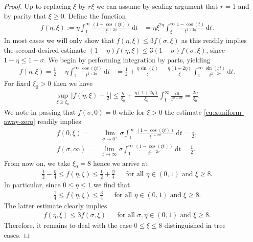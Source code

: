 \documentclass[12pt, reqno]{amsart}%
\theoremstyle{plain}  %
\theoremstyle{definition}  %
\theoremstyle{remark}
\numberwithin{equation}{section}
\renewcommand{\d}{\,\mathrm{d}}
\begin{document}
\begin{proof}
Up to replacing $\xi$ by $r\xi$ we can assume by scaling argument that $r=1$ and by parity that $\xi\geq 0$.
 Define the function
\begin{align*}
f(\eta,\xi):=\eta  \int_1^\infty \frac{(1-\cos (\xi t))}{t^{1+2\eta}}\d t&= \eta \xi^{2\eta}  \int_{\xi}^\infty \frac{1-\cos (t)}{t^{1+2\eta}}\d t.
\end{align*}
In most cases we  will only show that $f(\eta,\xi)\leq 3 f(\sigma,\xi)$ as this readily implies
the second desired estimate $ (1-\eta)f(\eta,\xi)\leq 3 (1-\sigma)f(\sigma,\xi)$, since $1-\eta\leq 1-\sigma$. We begin by performing integration by parts, yielding
\begin{align}\label{eq:xexpansion-away-zero}
f(\eta,\xi)= \frac{1}{2}- \eta  \int_1^\infty \frac{\cos (\xi t)}{t^{1+2\eta}}\d t
&=\frac{1}{2} + \frac{\eta\sin (\xi)}{\xi} -\frac{\eta(1+2\eta)}{\xi}   \int_1^\infty \frac{\sin (\xi t)}{t^{2+2\eta}}\d t.
\end{align}
For fixed $\xi_0>0$  then we have
\begin{align}\label{eq:xuniform-away-zero}
\sup_{\xi\geq \xi_0}\Big| f(\eta,\xi)-\frac12\Big| \leq \frac{\eta}{\xi_0}+ \frac{\eta (1+2\eta)}{\xi_0}\int_1^\infty\frac{\d t}{t^{2+2\eta}}=
\frac{2\eta}{\xi_0}.
\end{align}
We note in passing that $f(\sigma, 0)=0$ while for $\xi>0$ the estimate \eqref{eq:xuniform-away-zero} readily implies
\begin{align*}
f(0,\xi)=& \lim_{\sigma\to 0^+}\sigma  \int_1^\infty \frac{(1-\cos (\xi t))}{t^{1+2\sigma}}\d t
=\frac{1}{2},
\\
f(\sigma, \infty)=&\lim_{\xi\to \infty}\sigma  \int_1^\infty \frac{(1-\cos (\xi t))}{t^{1+2\sigma}}\d t =
\frac{1}{2}.
\end{align*}
From now on,  we take $\xi_0=8$ hence  we arrive at
\begin{align}\label{eq:xgen-bound}
\frac{1}{2}- \frac{\eta}{4}\leq f(\eta,\xi)\leq \frac{1}{2}+ \frac{\eta}{4}&& \text{for all $\eta\in (0,1) $ and $\xi\geq 8$}.
\end{align}
In particular, since $0\leq\eta\leq 1$ we find that
\begin{align*}
\frac{1}{4}\leq f(\eta,\xi)\leq \frac{3}{4}&& \text{for all $\eta\in (0,1) $ and $\xi\geq 8$}.
\end{align*}
The latter estimate clearly implies
\begin{align*}
f(\eta,\xi)\leq 3f(\sigma,\xi) && \text{for all $\sigma, \eta\in (0,1) $ and $\xi\geq 8$}.
\end{align*}
Therefore, it remains to deal with the case $0\leq \xi\leq 8$ distinguished in tree cases.
\vspace{1mm}


\end{proof}
\end{document}
